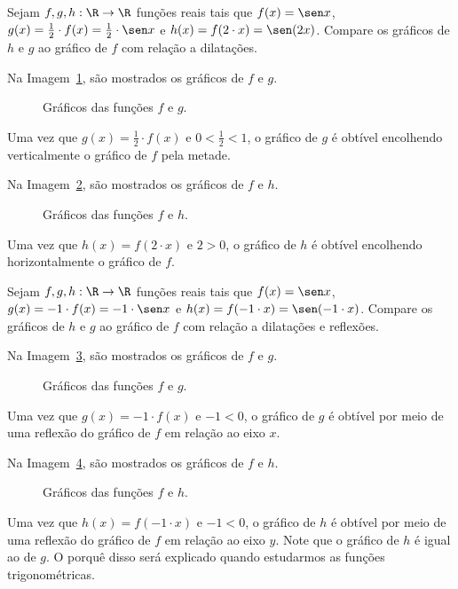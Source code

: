 \begin{example}
  Sejam $f, g , h: \R \to \R$ funções reais tais que $f(x) = \sen x$, $g(x) = \frac 1 2 \cdot f(x)  = \frac 1 2 \cdot \sen x $ e $h(x)= f(2 \cdot x)= \sen (2x)$.
  Compare os gráficos de $h$ e $g$ ao gráfico de $f$ com relação a dilatações.
\end{example}

\begin{solution}
Na Imagem~\ref{img:dilatacao-exemplo1-g}, são mostrados os gráficos de $f$ e $g$.
%
  \begin{figure}[H]
    \centering
    \caption{Gráficos das funções $f$ e $g$.}
    \label{img:dilatacao-exemplo1-g}
  \end{figure}
\noindent Uma vez que $g(x) = \frac 1 2 \cdot f(x)$ e $0 < \frac 1 2 < 1$, o gráfico de $g$ é obtível encolhendo verticalmente o gráfico de $f$ pela metade.

Na Imagem~\ref{img:dilatacao-exemplo1-h}, são mostrados os gráficos de $f$ e $h$.
%
  \begin{figure}[H]
    \centering
    \caption{Gráficos das funções $f$ e $h$.}
    \label{img:dilatacao-exemplo1-h}
  \end{figure}
\noindent Uma vez que $h(x) = f(2 \cdot x)$ e $2>0$, o gráfico de $h$ é obtível encolhendo horizontalmente o gráfico de $f$.
\end{solution}

\begin{example}
Sejam $f, g , h: \R \to \R$ funções reais tais que $f(x) = \sen x$, $g(x) = -1 \cdot f(x)  = -1 \cdot \sen x $ e $h(x)= f(-1 \cdot x)= \sen (-1 \cdot x)$.
Compare os gráficos de $h$ e $g$ ao gráfico de $f$ com relação a dilatações e reflexões.
\end{example}

\begin{solution}
Na Imagem~\ref{img:dilatacao-exemplo2-g}, são mostrados os gráficos de $f$ e $g$.
%
  \begin{figure}[H]
    \centering
    \caption{Gráficos das funções $f$ e $g$.}
    \label{img:dilatacao-exemplo2-g}
  \end{figure}
%
\noindent Uma vez que $g(x) = -1 \cdot f(x)$ e $-1 < 0$, o gráfico de $g$ é obtível por meio de uma reflexão do gráfico de $f$ em relação ao eixo $x$.

Na Imagem~\ref{img:dilatacao-exemplo2-h}, são mostrados os gráficos de $f$ e $h$.
%
  \begin{figure}[H]
    \centering
    \caption{Gráficos das funções $f$ e $h$.}
    \label{img:dilatacao-exemplo2-h}
  \end{figure}
\noindent Uma vez que $h(x)= f(-1 \cdot x)$ e $-1 < 0$, o gráfico de $h$ é obtível por meio de uma reflexão do gráfico de $f$ em relação ao eixo $y$.
Note que o gráfico de $h$ é igual ao de $g$. 
O porquê disso será explicado quando estudarmos as funções trigonométricas.
\end{solution}

